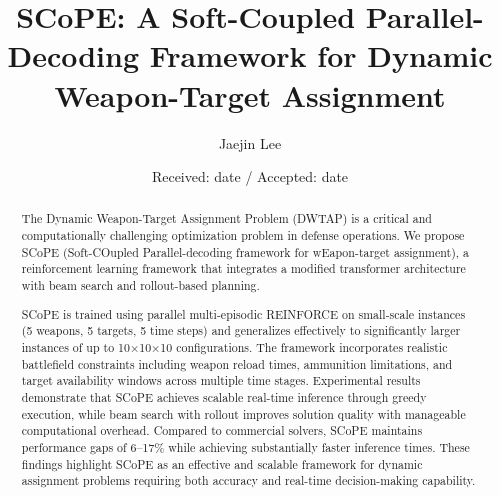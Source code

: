 \documentclass[smallcondensed]{svjour3}
\begin{document}
\title{SCoPE: A Soft-Coupled Parallel-Decoding Framework for Dynamic Weapon-Target Assignment}

\author{Jaejin Lee}


\date{Received: date / Accepted: date}

\maketitle

\begin{abstract}
The Dynamic Weapon-Target Assignment Problem (DWTAP) is a critical and computationally challenging optimization problem in defense operations. We propose SCoPE (Soft-COupled Parallel-decoding framework for wEapon-target assignment), a reinforcement learning framework that integrates a modified transformer architecture with beam search and rollout-based planning. %

SCoPE is trained using parallel multi-episodic REINFORCE on small-scale instances (5 weapons, 5 targets, 5 time steps) and generalizes effectively to significantly larger instances of up to 10×10×10 configurations. The framework incorporates realistic battlefield constraints including weapon reload times, ammunition limitations, and target availability windows across multiple time stages. Experimental results demonstrate that SCoPE achieves scalable real-time inference through greedy execution, while beam search with rollout improves solution quality with manageable computational overhead. Compared to commercial solvers, SCoPE maintains performance gaps of 6--17\% while achieving substantially faster inference times. These findings highlight SCoPE as an effective and scalable framework for dynamic assignment problems requiring both accuracy and real-time decision-making capability.

\end{abstract}
\end{document}
